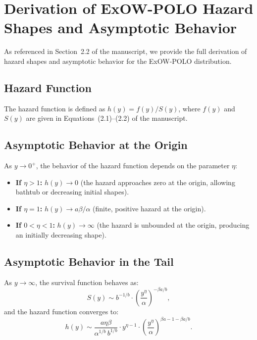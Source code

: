 \documentclass[12pt,a4paper]{article}
\begin{document}
\section{Derivation of ExOW-POLO Hazard Shapes and Asymptotic Behavior}

As referenced in Section~2.2 of the manuscript, we provide the full derivation of hazard shapes and asymptotic behavior for the ExOW-POLO distribution.

\subsection{Hazard Function}

The hazard function is defined as $h(y) = f(y) / S(y)$, where $f(y)$ and $S(y)$ are given in Equations~(2.1)--(2.2) of the manuscript.

\subsection{Asymptotic Behavior at the Origin}

As $y \to 0^+$, the behavior of the hazard function depends on the parameter $\eta$:

\begin{itemize}
\item \textbf{If $\eta > 1$:} $h(y) \to 0$ (the hazard approaches zero at the origin, allowing bathtub or decreasing initial shapes).
\item \textbf{If $\eta = 1$:} $h(y) \to a\beta/\alpha$ (finite, positive hazard at the origin).
\item \textbf{If $0 < \eta < 1$:} $h(y) \to \infty$ (the hazard is unbounded at the origin, producing an initially decreasing shape).
\end{itemize}

\subsection{Asymptotic Behavior in the Tail}

As $y \to \infty$, the survival function behaves as:
\begin{equation}
S(y) \sim b^{-1/b} \cdot \left(\frac{y^\eta}{\alpha}\right)^{-\beta a / b},
\end{equation}
and the hazard function converges to:
\begin{equation}
h(y) \sim \frac{a \eta \beta}{\alpha^{1/b} \, b^{1/b}} \cdot y^{\eta - 1} \cdot \left(\frac{y^\eta}{\alpha}\right)^{\beta a - 1 - \beta a/b}.
\end{equation}
\end{document}
